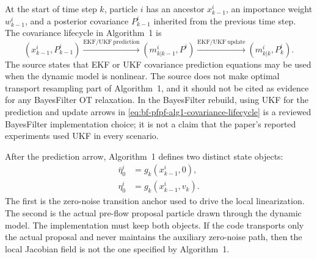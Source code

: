 At the start of time step $k$, particle $i$ has an ancestor
$x_{k-1}^i$, an importance weight $w_{k-1}^i$, and a posterior covariance
$P_{k-1}^i$ inherited from the previous time step.  The covariance lifecycle in
Algorithm~1 is
\begin{equation}
\label{eq:bf-pfpf-alg1-covariance-lifecycle}
  (x_{k-1}^i,P_{k-1}^i)
  \xrightarrow{\mathrm{EKF/UKF\ prediction}}
  (m_{k|k-1}^i,P^i)
  \xrightarrow{\mathrm{EKF/UKF\ update}}
  (m_{k|k}^i,P_k^i).
\end{equation}
The source states that EKF or UKF covariance prediction equations may be used
when the dynamic model is nonlinear.  The source does not make optimal
transport resampling part of Algorithm~1, and it should not be cited as
evidence for any BayesFilter OT relaxation.  In the BayesFilter rebuild, using
UKF for the prediction and update arrows in
\eqref{eq:bf-pfpf-alg1-covariance-lifecycle} is a reviewed BayesFilter implementation choice; it is not a claim that the
paper's reported experiments used UKF in every scenario.

After the prediction arrow, Algorithm~1 defines two distinct state objects:
\begin{align}
\label{eq:bf-pfpf-alg1-zero-noise-anchor}
  \bar\eta_0^i &= g_k(x_{k-1}^i,0),\\
\label{eq:bf-pfpf-alg1-preflo-sample}
  \eta_0^i &= g_k(x_{k-1}^i,v_k).
\end{align}
The first is the zero-noise transition anchor used to drive the local
linearization.  The second is the actual pre-flow proposal particle drawn
through the dynamic model.  The implementation must keep both objects.  If the
code transports only the actual proposal and never maintains the auxiliary
zero-noise path, then the local Jacobian field is not the one specified by
Algorithm~1.


